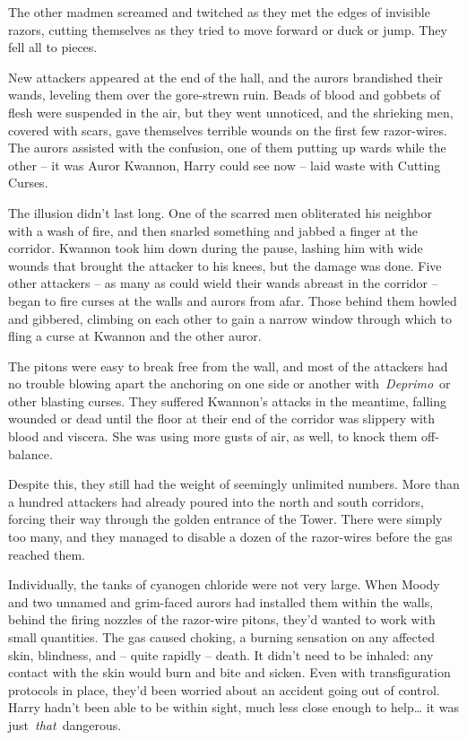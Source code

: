 The other madmen screamed and twitched as they met the edges of
invisible razors, cutting themselves as they tried to move forward or
duck or jump. They fell all to pieces.

New attackers appeared at the end of the hall, and the aurors brandished
their wands, leveling them over the gore-strewn ruin. Beads of blood and
gobbets of flesh were suspended in the air, but they went unnoticed, and
the shrieking men, covered with scars, gave themselves terrible wounds
on the first few razor-wires. The aurors assisted with the confusion,
one of them putting up wards while the other -- it was Auror Kwannon,
Harry could see now -- laid waste with Cutting Curses.

The illusion didn't last long. One of the scarred men obliterated his
neighbor with a wash of fire, and then snarled something and jabbed a
finger at the corridor. Kwannon took him down during the pause, lashing
him with wide wounds that brought the attacker to his knees, but the
damage was done. Five other attackers -- as many as could wield their
wands abreast in the corridor -- began to fire curses at the walls and
aurors from afar. Those behind them howled and gibbered, climbing on
each other to gain a narrow window through which to fling a curse at
Kwannon and the other auror.

The pitons were easy to break free from the wall, and most of the
attackers had no trouble blowing apart the anchoring on one side or
another with~\emph{Deprimo}~or other blasting curses. They suffered
Kwannon's attacks in the meantime, falling wounded or dead until the
floor at their end of the corridor was slippery with blood and viscera.
She was using more gusts of air, as well, to knock them off-balance.

Despite this, they still had the weight of seemingly unlimited numbers.
More than a hundred attackers had already poured into the north and
south corridors, forcing their way through the golden entrance of the
Tower. There were simply too many, and they managed to disable a dozen
of the razor-wires before the gas reached them.

Individually, the tanks of cyanogen chloride were not very large. When
Moody and two unnamed and grim-faced aurors had installed them within
the walls, behind the firing nozzles of the razor-wire pitons, they'd
wanted to work with small quantities. The gas caused choking, a burning
sensation on any affected skin, blindness, and -- quite rapidly --
death. It didn't need to be inhaled: any contact with the skin would
burn and bite and sicken. Even with transfiguration protocols in place,
they'd been worried about an accident going out of control. Harry hadn't
been able to be within sight, much less close enough to help\ldots{} it
was just~\emph{that}~dangerous.

